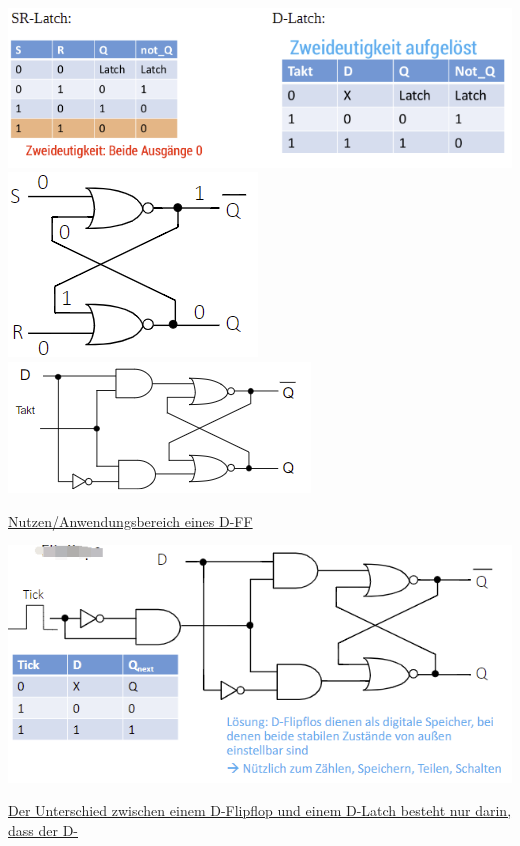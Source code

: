 \documentclass[fleqn]{article}
\begin{document}
\begin{center}
    \includegraphics[scale=0.6]{6.png}
    \includegraphics[scale=0.6]{12.png}
    \includegraphics[scale=0.6]{13.png}
\end{center}

\noindent\underline{Nutzen/Anwendungsbereich eines D-FF}

\begin{center}
    \includegraphics[scale=0.6]{14.png}
\end{center}

\noindent\underline{Der Unterschied zwischen einem D-Flipflop und einem D-Latch besteht nur darin, dass der D-}
\end{document}
